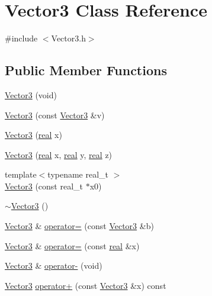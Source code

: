 \section{Vector3 Class Reference}
\label{classVector3}


{\ttfamily \#include $<$Vector3.h$>$}

\subsection*{Public Member Functions}
\begin{DoxyCompactItemize}
\item 
\hyperlink{classVector3_a020d62af9911f9f174a3f2adbace2270}{Vector3} (void)
\item 
\hyperlink{classVector3_a22b934b48fd08329bde8985a9ba21951}{Vector3} (const \hyperlink{classVector3}{Vector3} \&v)
\item 
\hyperlink{classVector3_aa441f00157da1718c8d766223d82bc90}{Vector3} (\hyperlink{Global_8h_a031f8951175b43076c2084a6c2173410}{real} x)
\item 
\hyperlink{classVector3_a1988729343351dc199b041cc89a796e1}{Vector3} (\hyperlink{Global_8h_a031f8951175b43076c2084a6c2173410}{real} x, \hyperlink{Global_8h_a031f8951175b43076c2084a6c2173410}{real} y, \hyperlink{Global_8h_a031f8951175b43076c2084a6c2173410}{real} z)
\item 
{\footnotesize template$<$typename real\_\-t $>$ }\\\hyperlink{classVector3_aefe96fed8ce3fa3849f5730d953db4c3}{Vector3} (const real\_\-t $\ast$x0)
\item 
\hyperlink{classVector3_a5545e13e2e2861ece8f14b12a6a8101f}{$\sim$Vector3} ()
\item 
\hyperlink{classVector3}{Vector3} \& \hyperlink{classVector3_ada7bacb389008b819afcb61621b21c84}{operator=} (const \hyperlink{classVector3}{Vector3} \&b)
\item 
\hyperlink{classVector3}{Vector3} \& \hyperlink{classVector3_a13f0d115108c851d2f1bc244538e0687}{operator=} (const \hyperlink{Global_8h_a031f8951175b43076c2084a6c2173410}{real} \&x)
\item 
\hyperlink{classVector3}{Vector3} \& \hyperlink{classVector3_a59a714eaecbb762e374be1e97aaa7b78}{operator-\/} (void)
\item 
\hyperlink{classVector3}{Vector3} \hyperlink{classVector3_a8148b32df1f3e85dfdbd360c8832a060}{operator+} (const \hyperlink{classVector3}{Vector3} \&x) const 
\item 

\end{DoxyCompactItemize}
